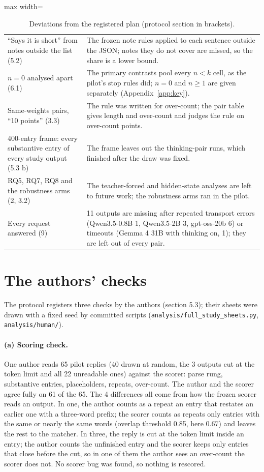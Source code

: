 \begin{table}[t]
\begin{adjustbox}{max width=\linewidth}
\begin{tabular}{@{}p{}p{}@{}}
    ``Says it is short'' from notes outside the list (5.2) & The frozen note rules applied to each sentence outside the JSON; notes they do not cover are missed, so the share is a lower bound. \\
    $n = 0$ analysed apart (6.1) & The primary contrasts pool every $n < k$ cell, as the pilot's stop rules did; $n = 0$ and $n \geq 1$ are given separately (Appendix~\ref{app:key}). \\
    Same-weights pairs, ``10 points'' (3.3) & The rule was written for over-count; the pair table gives length and over-count and judges the rule on over-count points. \\
    400-entry frame: every substantive entry of every study output (5.3 b) & The frame leaves out the thinking-pair runs, which finished after the draw was fixed. \\
    RQ5, RQ7, RQ8 and the robustness arms (2, 3.2) & The teacher-forced and hidden-state analyses are left to future work; the robustness arms ran in the pilot. \\
    Every request answered (9) & 11 outputs are missing after repeated transport errors (Qwen3.5-0.8B 1, Qwen3.5-2B 3, gpt-oss-20b 6) or timeouts (Gemma 4 31B with thinking on, 1); they are left out of every pair. \\
    \bottomrule
  \end{tabular}
  \end{adjustbox}
  \caption{Deviations from the registered plan (protocol section in brackets).}
  \label{tab:deviations}
\end{table}

\section{The authors' checks}
\label{app:checks}

The protocol registers three checks by the authors (section 5.3); their sheets were drawn with a fixed seed by committed scripts (\texttt{analysis/full\_study\_sheets.py}, \texttt{analysis/human/}).

\paragraph{(a) Scoring check.}
One author reads 65 pilot replies (40 drawn at random, the 3 outputs cut at the token limit and all 22 unreadable ones) against the scorer: parse rung, substantive entries, placeholders, repeats, over-count.
The author and the scorer agree fully on 61 of the 65.
The 4 differences all come from how the frozen scorer reads an output.
In one, the author counts as a repeat an entry that restates an earlier one with a three-word prefix; the scorer counts as repeats only entries with the same or nearly the same words (overlap threshold 0.85, here 0.67) and leaves the rest to the matcher.
In three, the reply is cut at the token limit inside an entry; the author counts the unfinished entry and the scorer keeps only entries that close before the cut, so in one of them the author sees an over-count the scorer does not.
No scorer bug was found, so nothing is rescored.

